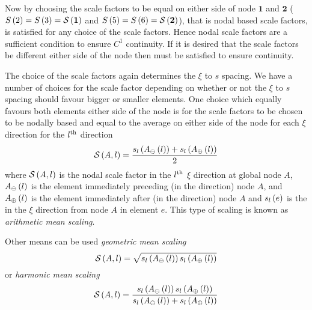Now by choosing the scale factors to be equal on either side of node
$\mathbf{1}$ and $\mathbf{2}$ (\ie $   S \left( {2} \right)  =   S \left( {3} \right)  =   \mathcal{S} \left( \mathbf{1} \right)  $
and $   S \left( {5} \right)  =   S \left( {6} \right)  =   \mathcal{S} \left( \mathbf{2} \right)  $), that is nodal based scale
factors,  is satisfied for any choice of the scale
factors.  Hence nodal scale factors are a sufficient condition to ensure
$C^{1}$ continuity. If it is desired that the scale factors be different
either side of the node then  must be satisfied to
ensure continuity.

The choice of the scale factors again determines the $\xi$
to $s$ spacing. We have a number of choices for the scale factor depending on
whether or not the $\xi$ to $s$ spacing should favour bigger or smaller
elements. One choice which equally favours both elements either side of the
node is for the scale factors to be chosen to be nodally based and equal to the average \arclen on either side
of the node for each $\xi$ direction \ie for the ${l}^{\text{th}}$ direction
\begin{equation}
  \nsftwo{A}{l}=\dfrac{\fnof{s_{l}}{\fnof{A_{\ominus}}{l}}+
    \fnof{s_{l}}{\fnof{A_{\oplus}}{l}}}{2}
  \label{eqn:arithmeanarclenscale}
\end{equation}
where $   \mathcal{S} \left( A,l \right)  $ is the nodal scale factor in the ${l}^{\text{th}}$ $\xi$
direction at global node $A$, $ A_{\ominus}\left( l \right) $ is the element
immediately preceding (in the  direction) node $A$, and
$ A_{\oplus}\left( l \right) $ is the element immediately after (in the 
direction) node $A$ and $ s_{l}\left( e \right) $ is the \arclen in the  $\xi$
direction from node $A$ in element $e$. This type of scaling is known as
\emph{arithmetic mean \arclen scaling}.

Other means can be used \ie \emph{geometric mean \arclen scaling}
\begin{equation}
  \nsftwo{A}{l}=\sqrt{\fnof{s_{l}}{\fnof{A_{\ominus}}{l}}
    \fnof{s_{l}}{\fnof{A_{\oplus}}{l}}}
  \label{eqn:geomeanarclenscale}
\end{equation}
or \emph{harmonic mean \arclen scaling}
\begin{equation}
  \nsftwo{A}{l}=\dfrac{\fnof{s_{l}}{\fnof{A_{\ominus}}{l}}
    \fnof{s_{l}}{\fnof{A_{\oplus}}{l}}}{\fnof{s_{l}}{\fnof{A_{\ominus}}{l}}+
    \fnof{s_{l}}{\fnof{A_{\oplus}}{l}}}
  \label{eqn:harmonicmeanarclenscale}
\end{equation}

